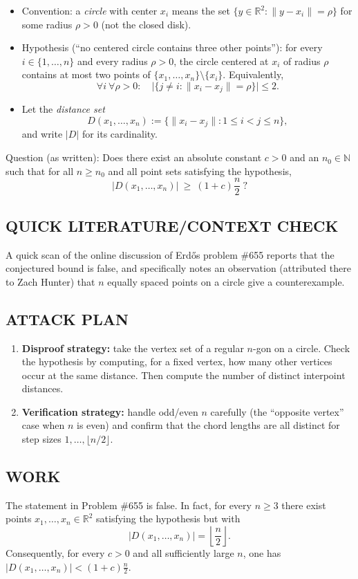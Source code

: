\begin{itemize}[leftmargin=*]
\item Convention: a \emph{circle} with center $x_i$ means the set $\{y\in\mathbb{R}^2: \|y-x_i\|=\rho\}$ for some radius $\rho>0$ (not the closed disk).
\item Hypothesis (``no centered circle contains three other points''): for every $i\in\{1,\dots,n\}$ and every radius $\rho>0$, the circle centered at $x_i$ of radius $\rho$ contains at most two points of $\{x_1,\dots,x_n\}\setminus\{x_i\}$. Equivalently,
\[
\forall i\ \forall \rho>0:\quad \bigl|\{j\neq i: \|x_i-x_j\|=\rho\}\bigr|\le 2.
\]
\item Let the \emph{distance set}
\[
D(x_1,\dots,x_n):=\{\|x_i-x_j\|: 1\le i<j\le n\},
\]
and write $|D|$ for its cardinality.
\end{itemize}

Question (as written): Does there exist an absolute constant $c>0$ and an $n_0\in\mathbb{N}$ such that for all $n\ge n_0$ and all point sets satisfying the hypothesis,
\[
|D(x_1,\dots,x_n)|\ \ge\ (1+c)\frac{n}{2}\ ?
\]

\subsection*{QUICK LITERATURE/CONTEXT CHECK}
A quick scan of the online discussion of Erd\H{o}s problem \#655 reports that the conjectured bound is false, and specifically notes an observation (attributed there to Zach Hunter) that $n$ equally spaced points on a circle give a counterexample.

\subsection*{ATTACK PLAN}
\begin{enumerate}[leftmargin=*]
\item \textbf{Disproof strategy:} take the vertex set of a regular $n$-gon on a circle. Check the hypothesis by computing, for a fixed vertex, how many other vertices occur at the same distance. Then compute the number of distinct interpoint distances.
\item \textbf{Verification strategy:} handle odd/even $n$ carefully (the ``opposite vertex'' case when $n$ is even) and confirm that the chord lengths are all distinct for step sizes $1,\dots,\lfloor n/2\rfloor$.
\end{enumerate}

\subsection*{WORK}
\begin{theorem}[Counterexample]
The statement in Problem \#655 is false. In fact, for every $n\ge 3$ there exist points $x_1,\dots,x_n\in\mathbb{R}^2$ satisfying the hypothesis but with
\[
|D(x_1,\dots,x_n)|=\left\lfloor\frac{n}{2}\right\rfloor.
\]
Consequently, for every $c>0$ and all sufficiently large $n$, one has
$|D(x_1,\dots,x_n)|<(1+c)\frac{n}{2}$.
\end{theorem}

